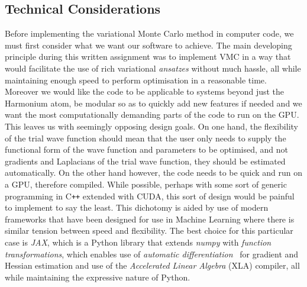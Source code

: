 \documentclass[final,3p,times,twocolumn]{elsarticle}
\begin{document}
	\subsection{Technical Considerations}
	Before implementing the variational Monte Carlo method in computer code, we must first consider what we want our software to achieve. The main developing principle during this written assignment was to implement VMC in a way that would facilitate the use of rich variational \emph{ansatzes} without much hassle, all while maintaining enough speed to perform optimisation in a reasonable time. Moreover we would like the code to be applicable to systems beyond just the Harmonium atom, be modular so as to quickly add new features if needed and we want the most computationally demanding parts of the code to run on the GPU. This leaves us with seemingly opposing design goals. On one hand, the flexibility of the trial wave function should mean that the user only needs to supply the functional form of the wave function and parameters to be optimised, and not gradients and Laplacians of the trial wave function, they should be estimated automatically. On the other hand however, the code needs to be quick and run on a GPU, therefore compiled. While possible, perhaps with some sort of generic programming in C\texttt{++} extended with CUDA, this sort of design would be painful to implement to say the least. This dichotomy is aided by use of modern frameworks that have been designed for use in Machine Learning where there is similar tension between speed and flexibility. The best choice for this particular case is \emph{JAX}, which is a Python library that extends \emph{numpy} with \emph{function transformations}, which enables use of \emph{automatic differentiation}~\cite{baydin2018automatic} for gradient and Hessian estimation and use of the \emph{Accelerated Linear Algebra} (XLA) compiler, all while maintaining the expressive nature of Python. 
	
\end{document}

